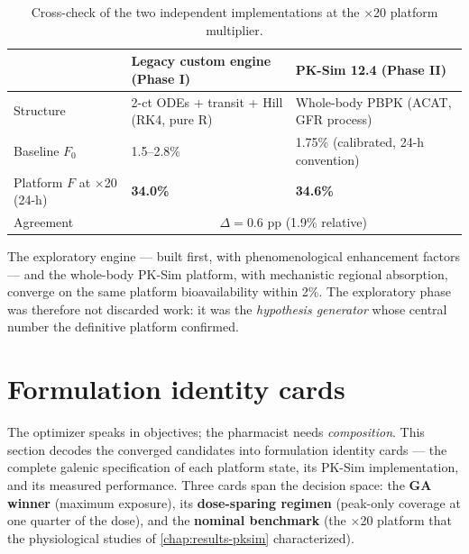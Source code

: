 \begin{table}[htbp]
\centering
\caption{Cross-check of the two independent implementations at the $\times$20 platform multiplier.}
\label{tab:res-crosscheck}
\footnotesize
\begin{tabular}{p{3.4cm}p{4.6cm}p{4.6cm}}
\toprule
& Legacy custom engine (Phase I) & PK-Sim 12.4 (Phase II) \\
\midrule
Structure & 2-ct ODEs + transit + Hill (RK4, pure R) & Whole-body PBPK (ACAT, GFR process) \\
Baseline $F_0$ & 1.5--2.8\% & 1.75\% (calibrated, 24-h convention) \\
Platform $F$ at $\times$20 (24-h) & \textbf{34.0\%} & \textbf{34.6\%} \\
Agreement & \multicolumn{2}{c}{$\Delta = 0.6$ pp (1.9\% relative)} \\
\bottomrule
\end{tabular}
\end{table}

The exploratory engine --- built first, with phenomenological enhancement factors --- and the whole-body PK-Sim platform, with mechanistic regional absorption, converge on the same platform bioavailability within 2\%. The exploratory phase was therefore not discarded work: it was the \emph{hypothesis generator} whose central number the definitive platform confirmed.


\section{Formulation identity cards}
\label{sec:formulation-cards}

The optimizer speaks in objectives; the pharmacist needs \emph{composition}. This section decodes the converged candidates into formulation identity cards --- the complete galenic specification of each platform state, its PK-Sim implementation, and its measured performance. Three cards span the decision space: the \textbf{GA winner} (maximum exposure), its \textbf{dose-sparing regimen} (peak-only coverage at one quarter of the dose), and the \textbf{nominal benchmark} (the $\times$20 platform that the physiological studies of \cref{chap:results-pksim} characterized).


